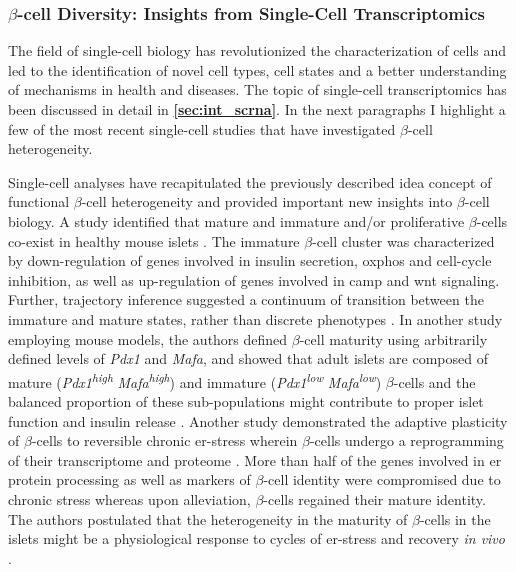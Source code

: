
\subsubsection{$\beta$-cell Diversity: Insights from Single-Cell Transcriptomics}

\par The field of single-cell biology has revolutionized the characterization of cells and led to the identification of novel cell types, cell states and a better understanding of mechanisms in health and diseases. The topic of single-cell transcriptomics has been discussed in detail in \textbf{\autoref{sec:int_scrna}}. In the next paragraphs I highlight a few of the most recent single-cell studies that have investigated $\beta$-cell heterogeneity.\\ 

\par Single-cell analyses have recapitulated the previously described idea concept of functional $\beta$-cell heterogeneity and provided important new insights into $\beta$-cell biology. A study identified that mature and immature and/or proliferative $\beta$-cells co-exist in healthy mouse islets \textbf{\cite{sachs_targeted_2020}}. The immature $\beta$-cell cluster was characterized by down-regulation of genes involved in insulin secretion, \gls{oxphos} and cell-cycle inhibition, as well as up-regulation of genes involved in \gls{camp} and \gls{wnt} signaling. Further, trajectory inference suggested a continuum of transition between the immature and mature states, rather than discrete phenotypes \textbf{\cite{sachs_targeted_2020}}. In another study employing mouse models, the authors defined $\beta$-cell maturity using arbitrarily defined levels of \textit{Pdx1} and \textit{Mafa}, and showed that adult islets are composed of mature (\textit{Pdx1}\textsuperscript{\textit{high}} \textit{Mafa}\textsuperscript{\textit{high}}) and immature (\textit{Pdx1}\textsuperscript{\textit{low}} \textit{Mafa}\textsuperscript{\textit{low}}) $\beta$-cells and the balanced proportion of these sub-populations might contribute to proper islet function and insulin release \textbf{\cite{nasteska_pdx1low_2021}}. Another study demonstrated the adaptive plasticity of $\beta$-cells to reversible chronic \gls{er}-stress wherein $\beta$-cells undergo a reprogramming of their transcriptome and proteome \textbf{\cite{chen_adaptation_2022}}. More than half of the genes involved in \gls{er} protein processing as well as markers of $\beta$-cell identity were compromised due to chronic stress whereas upon alleviation, $\beta$-cells regained their mature identity. The authors postulated that the heterogeneity in the maturity of $\beta$-cells in the islets might be a physiological response to cycles of \gls{er}-stress and recovery \textit{in vivo} \textbf{\cite{chen_adaptation_2022}}.\\

